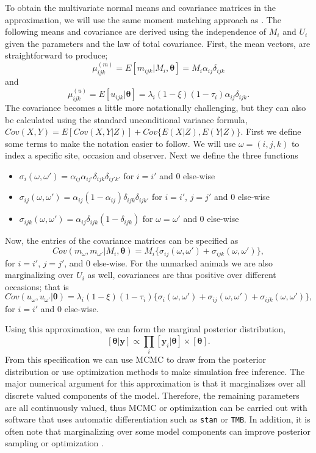 \documentclass[fleqn,10pt]{wlscirep}
\begin{document}
{To obtain the multivariate normal means and covariance matrices in the approximation, we will use the same moment matching approach as \cite{brintz2018asymptotic}. The following means and covariance are derived using the independence of \(M_i\) and \(U_i\) given the parameters and the law of total covariance. First, the mean vectors, are straightforward to produce;
\[
\mu_{ijk}^{(m)} = E[m_{ijk}|M_i, \boldsymbol{\theta}] = M_i\alpha_{ij}\delta_{ijk}
\]
and
\[
\mu_{ijk}^{(u)} = E[u_{ijk}|\boldsymbol{\theta}] = \lambda_i(1-\xi)(1-\tau_i)\alpha_{ij}\delta_{ijk}.
\]
The covariance becomes a little more notationally challenging, but they can also be calculated using the standard unconditional variance formula, \(Cov(X,Y) = E[Cov(X,Y|Z)] + Cov\{E(X|Z), E(Y|Z)\}\). First we define some terms to make the notation easier to follow. We will use \(\omega=(i,j,k)\) to index a specific site, occasion and observer. Next we define the three functions

\begin{itemize}
\tightlist
\item
  \(\sigma_i(\omega, \omega') = \alpha_{ij}\alpha_{ij'}\delta_{ijk}\delta_{ij'k'}\) for \(i=i'\) and 0 else-wise
\item
  \(\sigma_{ij}(\omega, \omega') = \alpha_{ij}(1-\alpha_{ij})\delta_{ijk}\delta_{ijk'}\) for \(i=i'\), \(j=j'\) and 0 else-wise
\item
  \(\sigma_{ijk}(\omega, \omega') = \alpha_{ij}\delta_{ijk}(1-\delta_{ijk})\) for \(\omega=\omega'\) and 0 else-wise
\end{itemize}

Now, the entries of the covariance matrices can be specified as
\[
Cov(m_\omega,m_{\omega'}|M_i, \boldsymbol{\theta}) = M_i\{\sigma_{ij}(\omega, \omega') + \sigma_{ijk}(\omega, \omega')\},
\]
for \(i=i'\), \(j=j'\), and 0 else-wise. For the unmarked animals we are also marginalizing over \(U_i\) as well, covariances are thus positive over different occasions; that is
\[
Cov(u_\omega,u_{\omega'}|\boldsymbol{\theta}) = \lambda_i(1-\xi)(1-\tau_i)\{\sigma_i(\omega, \omega')+\sigma_{ij}(\omega, \omega') + \sigma_{ijk}(\omega, \omega')\},
\]
for \(i=i'\) and 0 else-wise.

Using this approximation, we can form the marginal posterior distribution,
\[
[\boldsymbol{\theta}|\mathbf{y}] \propto 
\prod_i [\mathbf{y}_i|\boldsymbol{\theta}] \times [\boldsymbol{\theta}].
\]
From this specification we can use MCMC to draw from the posterior distribution or use optimization methods to make simulation free inference. The major numerical argument for this approximation is that it marginalizes over all discrete valued components of the model. Therefore, the remaining parameters are all continuously valued, thus MCMC or optimization can be carried out with software that uses automatic differentiation such as \texttt{stan} or \texttt{TMB}. In addition, it is often note that marginalizing over some model components can improve posterior sampling or optimization \cite{van2008partially}.

}
\end{document}
